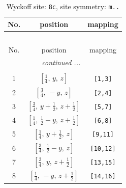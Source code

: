 \documentclass[fleqn,8pt]{jsarticle}
\begin{document}
\begin{longtable}{ccc}
\caption{Wyckoff site: {\tt 8c}, site symmetry: {\tt m..}}
 \\
 \hline \hline
No. & position & mapping \\ \hline \endfirsthead

\multicolumn{2}{l}{\tablename\ \thetable{}} \\
 \hline \hline
No. & position & mapping \\ \hline \endhead

 \hline \hline
\multicolumn{2}{r}{\footnotesize\it continued ...} \\ \endfoot

 \hline \hline
\multicolumn{2}{r}{} \\ \endlastfoot

1 & $\left[ \frac{1}{4},\, y,\, z \right]$ & {\tt [1,3]} \\ \hline
2 & $\left[ \frac{3}{4},\, - y,\, z \right]$ & {\tt [2,4]} \\ \hline
3 & $\left[ \frac{3}{4},\, y + \frac{1}{2},\, z + \frac{1}{2} \right]$ & {\tt [5,7]} \\ \hline
4 & $\left[ \frac{1}{4},\, \frac{1}{2} - y,\, z + \frac{1}{2} \right]$ & {\tt [6,8]} \\ \hline
5 & $\left[ \frac{1}{4},\, y + \frac{1}{2},\, z \right]$ & {\tt [9,11]} \\ \hline
6 & $\left[ \frac{3}{4},\, \frac{1}{2} - y,\, z \right]$ & {\tt [10,12]} \\ \hline
7 & $\left[ \frac{3}{4},\, y,\, z + \frac{1}{2} \right]$ & {\tt [13,15]} \\ \hline
8 & $\left[ \frac{1}{4},\, - y,\, z + \frac{1}{2} \right]$ & {\tt [14,16]} \\
\end{longtable}
\renewcommand{\arraystretch}{1.2}
\end{document}
